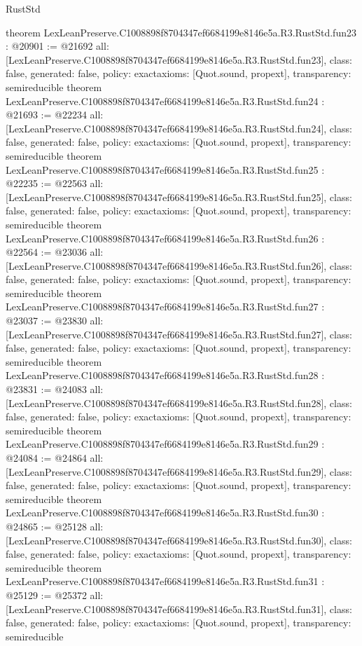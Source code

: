 \begin{lexlean}{RustStd}
\begin{coremodule}
{}
theorem LexLeanPreserve.C1008898f8704347ef6684199e8146e5a.R3.RustStd.fun23 : @20901 := @21692 {
  all: [LexLeanPreserve.C1008898f8704347ef6684199e8146e5a.R3.RustStd.fun23],
  class: false,
  generated: false,
  policy: exact{axioms: [Quot.sound, propext]},
  transparency: semireducible
}
theorem LexLeanPreserve.C1008898f8704347ef6684199e8146e5a.R3.RustStd.fun24 : @21693 := @22234 {
  all: [LexLeanPreserve.C1008898f8704347ef6684199e8146e5a.R3.RustStd.fun24],
  class: false,
  generated: false,
  policy: exact{axioms: [Quot.sound, propext]},
  transparency: semireducible
}
theorem LexLeanPreserve.C1008898f8704347ef6684199e8146e5a.R3.RustStd.fun25 : @22235 := @22563 {
  all: [LexLeanPreserve.C1008898f8704347ef6684199e8146e5a.R3.RustStd.fun25],
  class: false,
  generated: false,
  policy: exact{axioms: [Quot.sound, propext]},
  transparency: semireducible
}
theorem LexLeanPreserve.C1008898f8704347ef6684199e8146e5a.R3.RustStd.fun26 : @22564 := @23036 {
  all: [LexLeanPreserve.C1008898f8704347ef6684199e8146e5a.R3.RustStd.fun26],
  class: false,
  generated: false,
  policy: exact{axioms: [Quot.sound, propext]},
  transparency: semireducible
}
theorem LexLeanPreserve.C1008898f8704347ef6684199e8146e5a.R3.RustStd.fun27 : @23037 := @23830 {
  all: [LexLeanPreserve.C1008898f8704347ef6684199e8146e5a.R3.RustStd.fun27],
  class: false,
  generated: false,
  policy: exact{axioms: [Quot.sound, propext]},
  transparency: semireducible
}
theorem LexLeanPreserve.C1008898f8704347ef6684199e8146e5a.R3.RustStd.fun28 : @23831 := @24083 {
  all: [LexLeanPreserve.C1008898f8704347ef6684199e8146e5a.R3.RustStd.fun28],
  class: false,
  generated: false,
  policy: exact{axioms: [Quot.sound, propext]},
  transparency: semireducible
}
theorem LexLeanPreserve.C1008898f8704347ef6684199e8146e5a.R3.RustStd.fun29 : @24084 := @24864 {
  all: [LexLeanPreserve.C1008898f8704347ef6684199e8146e5a.R3.RustStd.fun29],
  class: false,
  generated: false,
  policy: exact{axioms: [Quot.sound, propext]},
  transparency: semireducible
}
theorem LexLeanPreserve.C1008898f8704347ef6684199e8146e5a.R3.RustStd.fun30 : @24865 := @25128 {
  all: [LexLeanPreserve.C1008898f8704347ef6684199e8146e5a.R3.RustStd.fun30],
  class: false,
  generated: false,
  policy: exact{axioms: [Quot.sound, propext]},
  transparency: semireducible
}
theorem LexLeanPreserve.C1008898f8704347ef6684199e8146e5a.R3.RustStd.fun31 : @25129 := @25372 {
  all: [LexLeanPreserve.C1008898f8704347ef6684199e8146e5a.R3.RustStd.fun31],
  class: false,
  generated: false,
  policy: exact{axioms: [Quot.sound, propext]},
  transparency: semireducible
}
\end{coremodule}
\end{lexlean}
